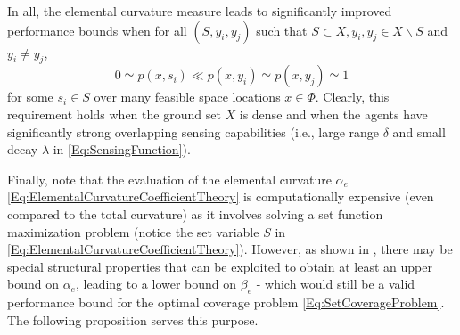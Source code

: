 \documentclass[letterpaper, 10 pt, conference]{ieeeconf}
\begin{document}
In all, the elemental curvature measure leads to significantly improved performance bounds when for all $(S,y_i,y_j)$ such that $S \subset X, y_i, y_j \in X\backslash S$ and $y_i \neq y_j$,  
$$
0 \simeq p(x,s_i) \ll p(x,y_i) \simeq p(x,y_j) \simeq 1
$$
for some $s_i \in S$ over many feasible space locations $x\in\Phi$. Clearly, this requirement holds when the ground set $X$ is dense and when the agents have significantly strong overlapping sensing capabilities (i.e., large range $\delta$ and small decay $\lambda$ in \eqref{Eq:SensingFunction}). 


Finally, note that the evaluation of the elemental curvature $\alpha_e$ \eqref{Eq:ElementalCurvatureCoefficientTheory} is computationally expensive (even compared to the total curvature) as it involves solving a set function maximization problem (notice the set variable $S$ in \eqref{Eq:ElementalCurvatureCoefficientTheory}). However, as shown in \cite{Sun2019}, there may be special structural properties that can be exploited to obtain at least an upper bound on $\alpha_e$, leading to a lower bound on $\beta_e$ - which would still be a valid performance bound for the optimal coverage problem \eqref{Eq:SetCoverageProblem}. The following proposition serves this purpose.
\end{document}

